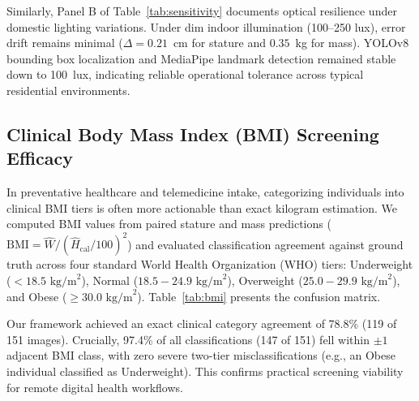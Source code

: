 \documentclass[conference]{IEEEtran}
\begin{document}
Similarly, Panel B of Table~\ref{tab:sensitivity} documents optical resilience under domestic lighting variations. Under dim indoor illumination (100--250 lux), error drift remains minimal ($\Delta = 0.21$~cm for stature and $0.35$~kg for mass). YOLOv8 bounding box localization and MediaPipe landmark detection remained stable down to 100~lux, indicating reliable operational tolerance across typical residential environments.

\subsection{Clinical Body Mass Index (BMI) Screening Efficacy}
In preventative healthcare and telemedicine intake, categorizing individuals into clinical BMI tiers is often more actionable than exact kilogram estimation. We computed BMI values from paired stature and mass predictions ($\text{BMI} = \widehat{W} / (\widehat{H}_{\text{cal}} / 100)^2$) and evaluated classification agreement against ground truth across four standard World Health Organization (WHO) tiers: Underweight ($<18.5\text{ kg/m}^2$), Normal ($18.5 - 24.9\text{ kg/m}^2$), Overweight ($25.0 - 29.9\text{ kg/m}^2$), and Obese ($\ge 30.0\text{ kg/m}^2$). Table~\ref{tab:bmi} presents the confusion matrix.

\begin{table}[t]
\caption{Clinical BMI Category Classification Matrix ($N=151$ Images)}
\label{tab:bmi}
\centering
{}
\end{table}

Our framework achieved an exact clinical category agreement of 78.8\% (119 of 151 images). Crucially, 97.4\% of all classifications (147 of 151) fell within $\pm 1$ adjacent BMI class, with zero severe two-tier misclassifications (e.g., an Obese individual classified as Underweight). This confirms practical screening viability for remote digital health workflows.
\end{document}
